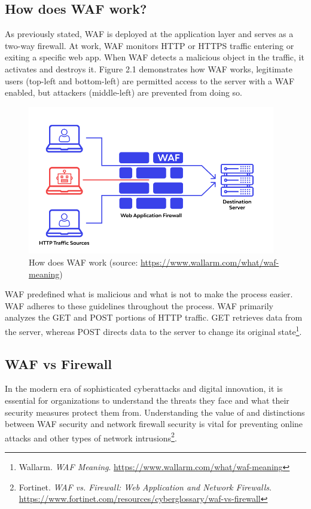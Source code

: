\subsection{How does WAF work?}
\label{subsec:waf_work}
\hspace{0.5cm}As previously stated, WAF is deployed at the application layer and serves as a two-way firewall. At work, WAF monitors HTTP or HTTPS traffic entering or exiting a specific web app. When WAF detects a malicious object in the traffic, it activates and destroys it. Figure 2.1 demonstrates how WAF works, legitimate users (top-left and bottom-left) are permitted access to the server with a WAF enabled, but attackers (middle-left) are prevented from doing so.
\begin{figure}[!h]
   
	\centering
	\includegraphics[width=\linewidth, height=6.5cm,keepaspectratio]{figures/wallarmwaf.png}
	\caption{How does WAF work (source: \url{https://www.wallarm.com/what/waf-meaning})}\label{Fig:Data1}
  
\end{figure}

\newpage
WAF predefined what is malicious and what is not to make the process easier. WAF adheres to these guidelines throughout the process. WAF primarily analyzes the GET and POST portions of HTTP traffic. GET retrieves data from the server, whereas POST directs data to the server to change its original state\footnote{Wallarm. \textit{WAF Meaning}. \url{https://www.wallarm.com/what/waf-meaning}}.



\subsection{WAF vs Firewall}
\label{subsec:versus}
\hspace{0.5cm}In the modern era of sophisticated cyberattacks and digital innovation, it is essential for organizations to understand the threats they face and what their security measures protect them from. Understanding the value of and distinctions between WAF security and network firewall security is vital for preventing online attacks and other types of network intrusions\footnote{Fortinet. \textit{WAF vs. Firewall: Web Application and Network Firewalls}. 
\url{https://www.fortinet.com/resources/cyberglossary/waf-vs-firewall}}.

